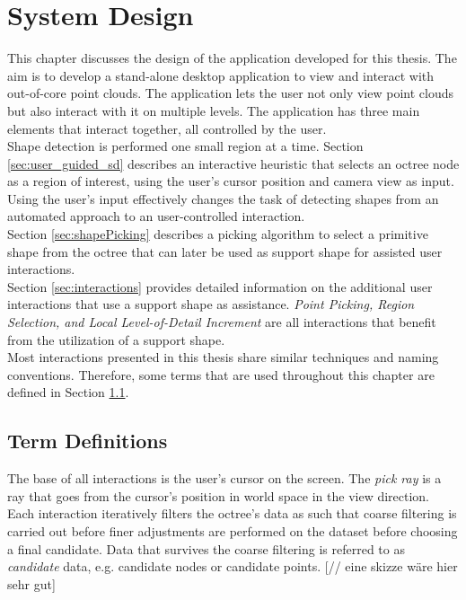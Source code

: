 \chapter{System Design}
\label{chap:systemDesign}

This chapter discusses the design of the application developed for this thesis. The aim is to develop a stand-alone desktop application to view and interact with out-of-core point clouds. The application lets the user not only view point clouds but also interact with it on multiple levels. The application has three main elements that interact together, all controlled by the user. 
\\
Shape detection is performed one small region at a time. Section \ref{sec:user_guided_sd} describes an interactive heuristic that selects an octree node as a region of interest, using the user's cursor position and camera view as input. Using the user's input effectively changes the task of detecting shapes from an automated approach to an user-controlled interaction.
\\
Section \ref{sec:shapePicking} describes a picking algorithm to select a primitive shape from the octree that can later be used as support shape for assisted user interactions. 
\\
Section \ref{sec:interactions} provides detailed information on the additional user interactions that use a support shape as assistance. \textit{Point Picking, Region Selection, and Local Level-of-Detail Increment} are all interactions that benefit from the utilization of a support shape. 
\\
Most interactions presented in this thesis share similar techniques and naming conventions. Therefore, some terms that are used throughout this chapter are defined in Section \ref{sec:termDefinitions}. 


\section{Term Definitions}
\label{sec:termDefinitions}

The base of all interactions is the user's cursor on the screen. The \textit{pick ray} is a ray that goes from the cursor’s position in world space in the view direction. 
Each interaction iteratively filters the octree's data as such that coarse filtering is carried out before finer adjustments are performed on the dataset before choosing a final candidate. Data that survives the coarse filtering is referred to as \textit{candidate} data, e.g. candidate nodes or candidate points.  [// eine skizze wäre hier sehr gut]


